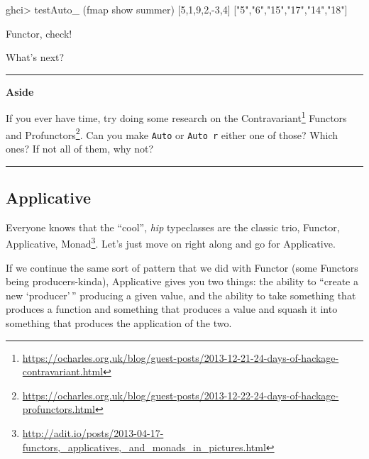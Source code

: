\documentclass[]{article}
\newenvironment{Shaded}{}{}
\newcommand{\DecValTok}[1]{\textcolor[rgb]{0.25,0.63,0.44}{#1}}
\newcommand{\FunctionTok}[1]{\textcolor[rgb]{0.02,0.16,0.49}{#1}}
\newcommand{\NormalTok}[1]{#1}
\newcommand{\StringTok}[1]{\textcolor[rgb]{0.25,0.44,0.63}{#1}}
\renewcommand{\href}[2]{#2\footnote{\url{#1}}}
\begin{document}
\begin{Shaded}
\begin{Highlighting}[]
\NormalTok{ghci}\FunctionTok{>}\NormalTok{ testAuto_ (fmap show summer) [}\DecValTok{5}\NormalTok{,}\DecValTok{1}\NormalTok{,}\DecValTok{9}\NormalTok{,}\DecValTok{2}\NormalTok{,}\FunctionTok{-}\DecValTok{3}\NormalTok{,}\DecValTok{4}\NormalTok{]}
\NormalTok{[}\StringTok{"5"}\NormalTok{,}\StringTok{"6"}\NormalTok{,}\StringTok{"15"}\NormalTok{,}\StringTok{"17"}\NormalTok{,}\StringTok{"14"}\NormalTok{,}\StringTok{"18"}\NormalTok{]}
\end{Highlighting}
\end{Shaded}

Functor, check!

What's next?

\begin{center}\rule{0.5\linewidth}{\linethickness}\end{center}

\textbf{Aside}

If you ever have time, try doing some research on the
\href{https://ocharles.org.uk/blog/guest-posts/2013-12-21-24-days-of-hackage-contravariant.html}{Contravariant}
Functors and
\href{https://ocharles.org.uk/blog/guest-posts/2013-12-22-24-days-of-hackage-profunctors.html}{Profunctors}.
Can you make \texttt{Auto} or \texttt{Auto\ r} either one of those? Which ones?
If not all of them, why not?

\begin{center}\rule{0.5\linewidth}{\linethickness}\end{center}

\hypertarget{applicative}{%
\subsection{Applicative}\label{applicative}}

Everyone knows that the ``cool'', \emph{hip} typeclasses are the classic trio,
\href{http://adit.io/posts/2013-04-17-functors,_applicatives,_and_monads_in_pictures.html}{Functor,
Applicative, Monad}. Let's just move on right along and go for Applicative.

If we continue the same sort of pattern that we did with Functor (some Functors
being producers-kinda), Applicative gives you two things: the ability to
``create a new `producer'\,'' producing a given value, and the ability to take
something that produces a function and something that produces a value and
squash it into something that produces the application of the two.
\end{document}
